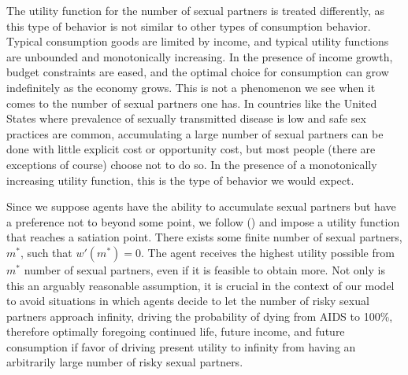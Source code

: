 \documentclass[12pt]{article}
\newcommand{\citee}[1]{\citename{#1} (\citeyear{#1})}
\begin{document}
The utility function for the number of sexual partners is treated differently, as this type of behavior is not similar to other types of consumption behavior.  Typical consumption goods are limited by income, and typical utility functions are unbounded and monotonically increasing.  In the presence of income growth, budget constraints are eased, and the optimal choice for consumption can grow indefinitely as the economy grows.  This is not a phenomenon we see when it comes to the number of sexual partners one has.  In countries like the United States where prevalence of sexually transmitted disease is low and safe sex practices are common, accumulating a large number of sexual partners can be done with little explicit cost or opportunity cost, but most people (there are exceptions of course) choose not to do so.  In the presence of a monotonically increasing utility function, this is the type of behavior we would expect.

Since we suppose agents have the ability to accumulate sexual partners but have a preference not to beyond some point, we follow \citee{kremer1996} and impose a utility function that reaches a satiation point.  There exists some finite number of sexual partners, $m^*$, such that $w'(m^*)=0$.  The agent receives the highest utility possible from $m^*$ number of sexual partners, even if it is feasible to obtain more.  Not only is this an arguably reasonable assumption, it is crucial in the context of our model to avoid situations in which agents decide to let the number of risky sexual partners approach infinity, driving the probability of dying from AIDS to 100\%, therefore optimally foregoing continued life, future income, and future consumption if favor of driving present utility to infinity from having an arbitrarily large number of risky sexual partners.
\end{document}
